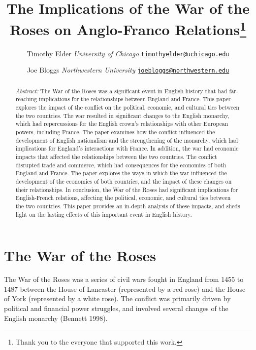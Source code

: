 \documentclass[11pt,article,oneside]{memoir}
\title{\bigskip \bigskip The Implications of the War of the Roses on
Anglo-Franco Relations\thanks{Thank you to the everyone that supported
this work.}  }
\author{\Large Timothy
Elder\vspace{0.05in} \newline\normalsize\emph{University of
Chicago} \newline\footnotesize \texttt{\href{mailto:timothyelder@uchicago.edu}{timothyelder@uchicago.edu}}\vspace*{0.2in}\newline  \and \Large Joe
Bloggs\vspace{0.05in} \newline\normalsize\emph{Northwestern
University} \newline\footnotesize \texttt{\href{mailto:joebloggs@northwestern.edu}{joebloggs@northwestern.edu}}\vspace*{0.2in}\newline }
\date{}
\begin{document}
  
\pagestyle{kjh}


\maketitle



\begin{abstract}

\vspace*{-0.75in}\noindent \emph{Abstract:} The War of the Roses was a
significant event in English history that had far-reaching implications
for the relationships between England and France. This paper explores
the impact of the conflict on the political, economic, and cultural ties
between the two countries. The war resulted in significant changes to
the English monarchy, which had repercussions for the English crown's
relationships with other European powers, including France. The paper
examines how the conflict influenced the development of English
nationalism and the strengthening of the monarchy, which had
implications for England's interactions with France. In addition, the
war had economic impacts that affected the relationships between the two
countries. The conflict disrupted trade and commerce, which had
consequences for the economies of both England and France. The paper
explores the ways in which the war influenced the development of the
economies of both countries, and the impact of these changes on their
relationships. In conclusion, the War of the Roses had significant
implications for English-French relations, affecting the political,
economic, and cultural ties between the two countries. This paper
provides an in-depth analysis of these impacts, and sheds light on the
lasting effects of this important event in English history.

\end{abstract}


\hypertarget{the-war-of-the-roses}{%
\section{The War of the Roses}\label{the-war-of-the-roses}}

The War of the Roses was a series of civil wars fought in England from
1455 to 1487 between the House of Lancaster (represented by a red rose)
and the House of York (represented by a white rose). The conflict was
primarily driven by political and financial power struggles, and
involved several changes of the English monarchy (Bennett 1998).
\end{document}
